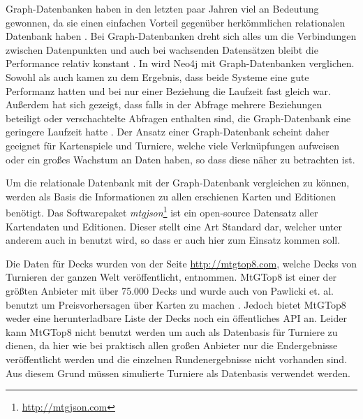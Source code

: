 Graph-Datenbanken haben in den letzten paar Jahren viel an Bedeutung gewonnen, da sie einen einfachen Vorteil gegenüber herkömmlichen relationalen Datenbank haben \cite{forbes:trend.graphdb}. Bei Graph-Datenbanken dreht sich alles um die Verbindungen zwischen Datenpunkten und auch bei wachsenden Datensätzen bleibt die Performance relativ konstant \cite{robinsongraph:2015}. 
In \cite{vicknair2010comparison, miller2013graph, jaiswal2013comparative} wird Neo4j mit Graph-Datenbanken verglichen. Sowohl \cite{vicknair2010comparison} als auch \cite{jaiswal2013comparative} kamen zu dem Ergebnis, dass beide Systeme eine gute Performanz hatten und bei nur einer Beziehung die Laufzeit fast gleich war. Außerdem hat sich gezeigt, dass falls in der Abfrage mehrere Beziehungen beteiligt oder verschachtelte Abfragen enthalten sind, die Graph-Datenbank eine geringere Laufzeit hatte \cite{jaiswal2013comparative}. Der Ansatz einer Graph-Datenbank scheint daher geeignet für Kartenspiele und Turniere, welche viele Verknüpfungen aufweisen oder ein großes Wachstum an Daten haben, so dass diese näher zu betrachten ist.

Um die relationale Datenbank mit der Graph-Datenbank vergleichen zu können, werden als Basis die Informationen zu allen erschienen Karten und Editionen benötigt. Das Softwarepaket \emph{mtgjson}\footnote{\url{http://mtgjson.com}} ist ein open-source Datensatz aller Kartendaten und Editionen. Dieser stellt eine Art Standard dar, welcher unter anderem auch in \cite{finkpredicting, perkhounkovfinancial, pawlicki2014prediction} benutzt wird, so dass er auch hier zum Einsatz kommen soll. 

Die Daten für Decks wurden von der Seite \url{http://mtgtop8.com}, welche Decks von Turnieren der ganzen Welt veröffentlicht, entnommen. MtGTop8 ist einer der größten Anbieter mit über 75.000 Decks und wurde auch von Pawlicki et. al. benutzt um Preisvorhersagen über Karten zu machen \cite{pawlicki2014prediction}. Jedoch bietet MtGTop8 weder eine herunterladbare Liste der Decks noch ein öffentliches \ac{API} an. 
Leider kann MtGTop8 nicht benutzt werden um auch als Datenbasis für Turniere zu dienen, da hier wie bei praktisch allen großen Anbieter nur die Endergebnisse veröffentlicht werden und die einzelnen Rundenergebnisse nicht vorhanden sind. Aus diesem Grund müssen simulierte Turniere als Datenbasis verwendet werden.

